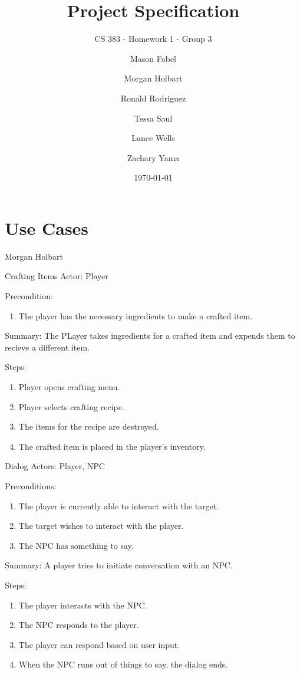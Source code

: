 \documentclass[12pt]{report}
\title{Project Specification}
\subtitle{CS 383 - Homework 1 - Group 3}
\author{
Mason Fabel \\
\and Morgan Holbart \\
\and Ronald Rodriguez \\
\and Tessa Saul \\
\and Lance Wells \\
\and Zachary Yama \\
}
\date{\today}
\begin{document}
\maketitle

\chapter{Use Cases}

\begin{section}{Morgan Holbart}
\begin{subsection}{Crafting Items}
Actor: Player

Precondition:
\begin{enumerate}
\item The player has the necessary ingredients to make a crafted item.
\end{enumerate}

Summary: The PLayer takes ingredients for a crafted item and expends them to
recieve a different item.

Steps:
\begin{enumerate}
\item Player opens crafting menu.
\item Player selects crafting recipe.
\item The items for the recipe are destroyed.
\item The crafted item is placed in the player's inventory.
\end{enumerate}
\end{subsection}

\begin{subsection}{Dialog}
Actors: Player, NPC

Preconditions:
\begin{enumerate}
\item The player is currently able to interact with the target.
\item The target wishes to interact with the player.
\item The NPC has something to say.
\end{enumerate}

Summary: A player tries to initiate conversation with an NPC.

Steps:
\begin{enumerate}
\item The player interacts with the NPC.
\item The NPC responds to the player.
\item The player can respond based on user input.
\item When the NPC runs out of things to say, the dialog ends.
\end{enumerate}
\end{subsection}


\end{section}
\end{document}
